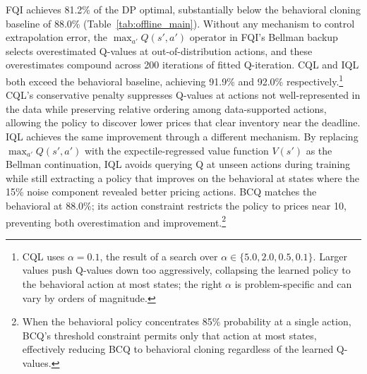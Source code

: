 \begin{table}[t]
\centering
\caption[Policy value for each offline RL method, expressed as mean return and percentage of the DP optimal]{\textbf{Policy value for each offline RL method, expressed as mean return and percentage of the DP optimal.} Standard errors computed over 20 seeds.}
\label{tab:offline_main}

\end{table}

FQI achieves 81.2\% of the DP optimal, substantially below the behavioral cloning baseline of 88.0\% (Table~\ref{tab:offline_main}). Without any mechanism to control extrapolation error, the $\max_{a'} Q(s', a')$ operator in FQI's Bellman backup selects overestimated Q-values at out-of-distribution actions, and these overestimates compound across 200 iterations of fitted Q-iteration. CQL and IQL both exceed the behavioral baseline, achieving 91.9\% and 92.0\% respectively.\footnote{CQL uses $\alpha = 0.1$, the result of a search over $\alpha \in \{5.0, 2.0, 0.5, 0.1\}$. Larger values push Q-values down too aggressively, collapsing the learned policy to the behavioral action at most states; the right $\alpha$ is problem-specific and can vary by orders of magnitude.} CQL's conservative penalty suppresses Q-values at actions not well-represented in the data while preserving relative ordering among data-supported actions, allowing the policy to discover lower prices that clear inventory near the deadline. IQL achieves the same improvement through a different mechanism. By replacing $\max_{a'} Q(s', a')$ with the expectile-regressed value function $V(s')$ as the Bellman continuation, IQL avoids querying Q at unseen actions during training while still extracting a policy that improves on the behavioral at states where the 15\% noise component revealed better pricing actions. BCQ matches the behavioral at 88.0\%; its action constraint restricts the policy to prices near 10, preventing both overestimation and improvement.\footnote{When the behavioral policy concentrates 85\% probability at a single action, BCQ's threshold constraint permits only that action at most states, effectively reducing BCQ to behavioral cloning regardless of the learned Q-values.}

